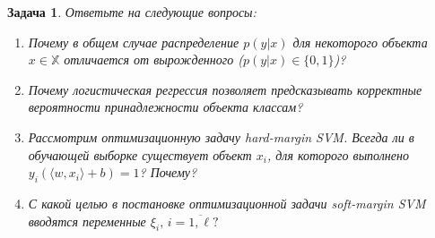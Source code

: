 \documentclass[12pt,fleqn]{article}
\newtheorem{esProblem}{Задача}
\begin{document}
\begin{esProblem}
Ответьте на следующие вопросы:
\begin{enumerate}
\item Почему в общем случае распределение $p(y|x)$ для некоторого объекта $x \in \mathbb{X}$ отличается от вырожденного ($p(y|x) \in \{0,1\}$)?
\item Почему логистическая регрессия позволяет предсказывать корректные вероятности принадлежности объекта классам?
\item Рассмотрим оптимизационную задачу hard-margin SVM. Всегда ли в обучающей выборке существует объект $x_i$, для которого выполнено $y_i (\langle w, x_i \rangle + b) = 1$? Почему?
\item С какой целью в постановке оптимизационной задачи soft-margin SVM вводятся переменные $\xi_i, \, i = \overline{1, \ell}?$
\end{enumerate}
\end{esProblem}
\end{document}
